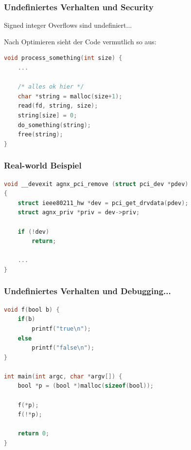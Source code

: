 \documentclass[12pt,compress]{beamer}
\begin{document}
\begin{frame}[fragile]
\frametitle{Undefiniertes Verhalten und Security}

Signed integer Overflows sind undefiniert...

\vfill

Nach Optimieren sieht der Code vermutlich so aus:

\vfill

\begin{lstlisting}[language=C,basicstyle=\ttfamily\small,keywordstyle=\color{red}]
void process_something(int size) {
    ...

    /* alles ok hier */
    char *string = malloc(size+1);
    read(fd, string, size);
    string[size] = 0;
    do_something(string);
    free(string);
}
\end{lstlisting}
\end{frame}

\begin{frame}[fragile]
\frametitle{Real-world Beispiel}

\begin{lstlisting}[language=C,basicstyle=\ttfamily\small,keywordstyle=\color{red}]
void __devexit agnx_pci_remove (struct pci_dev *pdev)
{
    struct ieee80211_hw *dev = pci_get_drvdata(pdev);
    struct agnx_priv *priv = dev->priv; 

    if (!dev)
        return;

    ...
}
\end{lstlisting}
\end{frame}



\begin{frame}[fragile]
\frametitle{Undefiniertes Verhalten und Debugging...}

\begin{lstlisting}[language=C,basicstyle=\ttfamily\small,keywordstyle=\color{red}]
void f(bool b) {
    if(b)
        printf("true\n");
    else
        printf("false\n");
}

int main(int argc, char *argv[]) {
    bool *p = (bool *)malloc(sizeof(bool));

    f(*p);
    f(!*p);

    return 0;
}
\end{lstlisting}
\end{frame}
\end{document}
